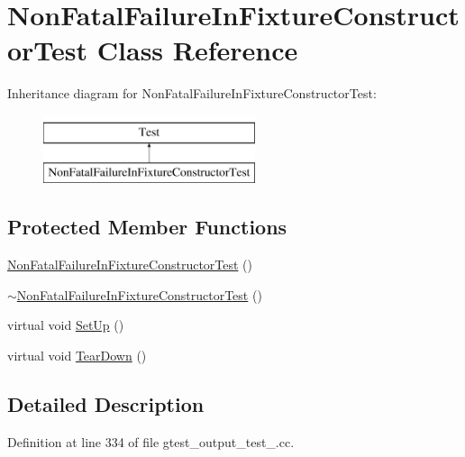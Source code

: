 \hypertarget{classNonFatalFailureInFixtureConstructorTest}{\section{\-Non\-Fatal\-Failure\-In\-Fixture\-Constructor\-Test \-Class \-Reference}
\label{da/d2d/classNonFatalFailureInFixtureConstructorTest}
}
\-Inheritance diagram for \-Non\-Fatal\-Failure\-In\-Fixture\-Constructor\-Test\-:\begin{figure}[H]
\begin{center}
\leavevmode
\includegraphics[height=2.000000cm]{da/d2d/classNonFatalFailureInFixtureConstructorTest}
\end{center}
\end{figure}
\subsection*{\-Protected \-Member \-Functions}
\begin{DoxyCompactItemize}
\item 
\hyperlink{classNonFatalFailureInFixtureConstructorTest_a4daefaa5568bad478fa86acb53c2bc71}{\-Non\-Fatal\-Failure\-In\-Fixture\-Constructor\-Test} ()
\item 
\hyperlink{classNonFatalFailureInFixtureConstructorTest_ada462162e99255f42e2aef2d9c9938b1}{$\sim$\-Non\-Fatal\-Failure\-In\-Fixture\-Constructor\-Test} ()
\item 
virtual void \hyperlink{classNonFatalFailureInFixtureConstructorTest_a901706a587f9ae84df8b2395fbe759cb}{\-Set\-Up} ()
\item 
virtual void \hyperlink{classNonFatalFailureInFixtureConstructorTest_a870a092058305911f3d42df45dd657e5}{\-Tear\-Down} ()
\end{DoxyCompactItemize}


\subsection{\-Detailed \-Description}


\-Definition at line 334 of file gtest\-\_\-output\-\_\-test\-\_\-.\-cc.



